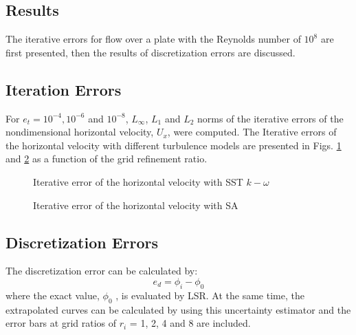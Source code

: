 \documentclass{cfdsc}
\begin{document}
\begin{multicols}{2}
\section{Results}
The iterative errors for flow over a plate with the Reynolds number of $10^8$ are first presented, then the results of discretization errors are discussed.

\subsection{Iteration Errors}
For $e_t=10^{-4} , 10^{-6}$ and $10^{-8}$, $L_{\infty}$, $L_{1}$ and $L_{2}$ norms of the iterative errors of the nondimensional horizontal velocity, $U_x$, were computed. The Iterative errors of the horizontal velocity with different turbulence models are presented in Figs. \ref{fig:Iterative_Error_U_X_SSTKW} and \ref{fig:Iterative_Error_U_X_SA} as a function of the grid refinement ratio.
\begin{figure}[H]
\caption{Iterative error of the horizontal velocity with SST $ k-\omega $}
\label{fig:Iterative_Error_U_X_SSTKW}
\end{figure}
\begin{figure}[H]
\vspace{-0.8cm}  
\setlength{\abovecaptionskip}{-0.2cm}   
\setlength{\belowcaptionskip}{-1cm} 
\caption{Iterative error of the horizontal velocity with SA}
\label{fig:Iterative_Error_U_X_SA}
\end{figure}

\subsection{Discretization Errors}
The discretization error can be calculated by:
\begin{equation}\label{eq:eq_7}
e_d=\phi_i-\phi_0
\end{equation}
where the exact value, $\phi_0$ , is evaluated by LSR. At the same time, the extrapolated curves can be calculated by using this uncertainty estimator and the error bars at grid ratios of $r_i$ = 1, 2, 4 and 8 are included.


\end{multicols}
\end{document}
